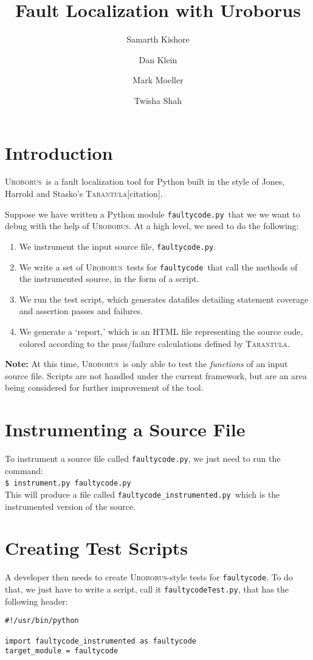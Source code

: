 \documentclass[english]{article}
\title{Fault Localization with Uroborus}
\author{Samarth Kishore
\and 
Dan Klein
\and 
Mark Moeller
\and 
Twisha Shah
}
\newcommand{\Uro}{\textsc{Uroborus}}
\newcommand{\Taran}{\textsc{Tarantula}}
\newcommand{\fc}{\texttt{faultycode}}
\newcommand{\fcp}{\texttt{faultycode.py}}
\newcommand{\fcT}{\texttt{faultycodeTest.py}}
\newcommand{\fcip}{\texttt{faultycode\_instrumented.py}}
\begin{document}
\maketitle


\section{Introduction}

\Uro\ is a fault localization tool for Python built in the style of Jones, Harrold and Stasko's
\Taran [citation]. 

Suppose we have written a Python module \fcp\ that we we want to debug with the
help of \Uro. At a high level, we need to do the following:
\begin{enumerate}
\item We instrument the input source file, \fcp.
\item We write a set of \Uro\ tests for \fc\ that call the methods of the instrumented source, in the
form of a script.
\item We run the test script, which generates datafiles detailing statement coverage and assertion
passes and failures.
\item We generate a `report,' which is an HTML file representing the source code, colored according
to the pass/failure calculations defined by \Taran.
\end{enumerate}
\textbf{Note:} At this time, \Uro\ is only able to test the \emph{functions} of an
input source file. Scripts are not handled under the current framework, but are an area being
considered for further improvement of the tool.

\section{Instrumenting a Source File}

To instrument a source file called \fcp, we just need to run the command:\\
\texttt{\$ instrument.py }\fcp\ \\
This will produce a file called \fcip\  which is the instrumented version of the source.

\section{Creating Test Scripts}

A developer then needs to create \Uro-style tests for \fc. To do that, we just have to write a
script, call it \fcT, that has the following header:\\
\begin{verbatim}
#!/usr/bin/python

import faultycode_instrumented as faultycode
target_module = faultycode

\end{verbatim}
\end{document}
